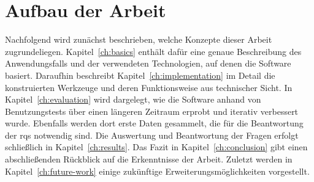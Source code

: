 \section{Aufbau der Arbeit}\label{sec:structure}

Nachfolgend wird zunächst beschrieben, welche Konzepte dieser Arbeit zugrundeliegen.
Kapitel~\ref{ch:basics} enthält dafür eine genaue Beschreibung des Anwendungsfalls und der verwendeten Technologien, auf denen die Software basiert.
Daraufhin beschreibt Kapitel~\ref{ch:implementation} im Detail die konstruierten Werkzeuge und deren Funktionsweise aus technischer Sicht.
In Kapitel~\ref{ch:evaluation} wird dargelegt, wie die Software anhand von Benutzungstests über einen längeren Zeitraum erprobt und iterativ verbessert wurde.
Ebenfalls werden dort erste Daten gesammelt, die für die Beantwortung der \acp{rq} notwendig sind.
Die Auswertung und Beantwortung der Fragen erfolgt schließlich in Kapitel~\ref{ch:results}.
Das Fazit in Kapitel~\ref{ch:conclusion} gibt einen abschließenden Rückblick auf die Erkenntnisse der Arbeit.
Zuletzt werden in Kapitel~\ref{ch:future-work} einige zukünftige Erweiterungsmöglichkeiten vorgestellt.
